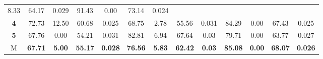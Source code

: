 \begin{table}[H]
{\begin{tabular}{ccccccccccccc}
		\multicolumn{1}{c|}{8.33} &
		\multicolumn{1}{c|}{64.17} &
		\multicolumn{1}{c|}{0.029} &
		\multicolumn{1}{c|}{91.43} &
		\multicolumn{1}{c|}{0.00} &
		\multicolumn{1}{c|}{73.14} &
		\multicolumn{1}{c|}{0.024} \\ \cline{2-13} 
		\multicolumn{1}{c|}{\cellcolor[HTML]{C0C0C0}\textbf{4}} &
		\multicolumn{1}{c|}{72.73} &
		\multicolumn{1}{c|}{12.50} &
		\multicolumn{1}{c|}{60.68} &
		\multicolumn{1}{c|}{0.025} &
		\multicolumn{1}{c|}{68.75} &
		\multicolumn{1}{c|}{2.78} &
		\multicolumn{1}{c|}{55.56} &
		\multicolumn{1}{c|}{0.031} &
		\multicolumn{1}{c|}{84.29} &
		\multicolumn{1}{c|}{0.00} &
		\multicolumn{1}{c|}{67.43} &
		\multicolumn{1}{c|}{0.025} \\ \cline{2-13} 
		\multicolumn{1}{c|}{\cellcolor[HTML]{C0C0C0}\textbf{5}} &
		\multicolumn{1}{c|}{67.76} &
		\multicolumn{1}{c|}{0.00} &
		\multicolumn{1}{c|}{54.21} &
		\multicolumn{1}{c|}{0.031} &
		\multicolumn{1}{c|}{82.81} &
		\multicolumn{1}{c|}{6.94} &
		\multicolumn{1}{c|}{67.64} &
		\multicolumn{1}{c|}{0.03} &
		\multicolumn{1}{c|}{79.71} &
		\multicolumn{1}{c|}{0.00} &
		\multicolumn{1}{c|}{63.77} &
		\multicolumn{1}{c|}{0.027} \\ \cline{2-13} 
		\multicolumn{1}{c|}{\cellcolor[HTML]{FFFE65}M} &
		\multicolumn{1}{c|}{\textbf{67.71}} &
		\multicolumn{1}{c|}{\textbf{5.00}} &
		\multicolumn{1}{c|}{\textbf{55.17}} &
		\multicolumn{1}{c|}{\textbf{0.028}} &
		\multicolumn{1}{c|}{\textbf{76.56}} &
		\multicolumn{1}{c|}{\textbf{5.83}} &
		\multicolumn{1}{c|}{\textbf{62.42}} &
		\multicolumn{1}{c|}{\textbf{0.03}} &
		\multicolumn{1}{c|}{\textbf{85.08}} &
		\multicolumn{1}{c|}{\textbf{0.00}} &
		\multicolumn{1}{c|}{\textbf{68.07}} &
		\multicolumn{1}{c|}{\textbf{0.026}} \\ \cline{2-13} 
	\end{tabular}
}
\end{table}